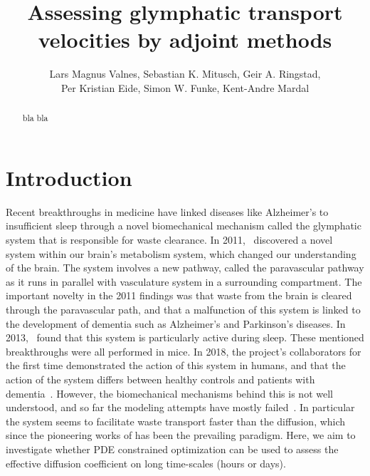 \documentclass[11pt,a4paper]{article}
\title{Assessing glymphatic transport velocities by adjoint methods}
\author{Lars Magnus Valnes, Sebastian K. Mitusch, Geir A. Ringstad, \\ 
Per Kristian Eide, Simon W. Funke, Kent-Andre Mardal }
\begin{document}
\maketitle

\begin{abstract}
bla bla 
\end{abstract}
\section{Introduction}
Recent breakthroughs in medicine have linked diseases like Alzheimer's to insufficient sleep through a novel biomechanical mechanism called the glymphatic system 
that is responsible for waste clearance. 
In 2011,~\citet{iliff2012paravascular} discovered a novel system within our brain's metabolism system, which changed our understanding of the brain. 
The system involves a new pathway, called the paravascular pathway as it runs in parallel with vasculature system in a surrounding compartment.
The important novelty in the 2011 findings was that waste from the brain is cleared through the paravascular path, and that a malfunction of this system 
is linked to the development of dementia such as Alzheimer's and Parkinson's diseases. In 2013,~\citet{xie2013sleep} found
that this system is particularly active during sleep.
These mentioned breakthroughs were all performed in mice. In 2018,  
the project's collaborators for the first time demonstrated the action of
this system in humans, and that the action of the system differs
between healthy controls and patients with dementia~\cite{ringstad2018brain}. 
However, the biomechanical mechanisms behind this is not well understood,
and so far the modeling attempts have mostly failed~\cite{asgari2016glymphatic, holter2017interstitial, smith2017glymphatic}. 
In particular the system seems to facilitate waste transport faster than  
the diffusion, which since the pioneering works of \cite{sykova2008diffusion} 
has been the prevailing paradigm. Here, we aim to investigate whether PDE constrained optimization can be used
to assess the effective diffusion coefficient on long time-scales (hours or days).   
\end{document}
